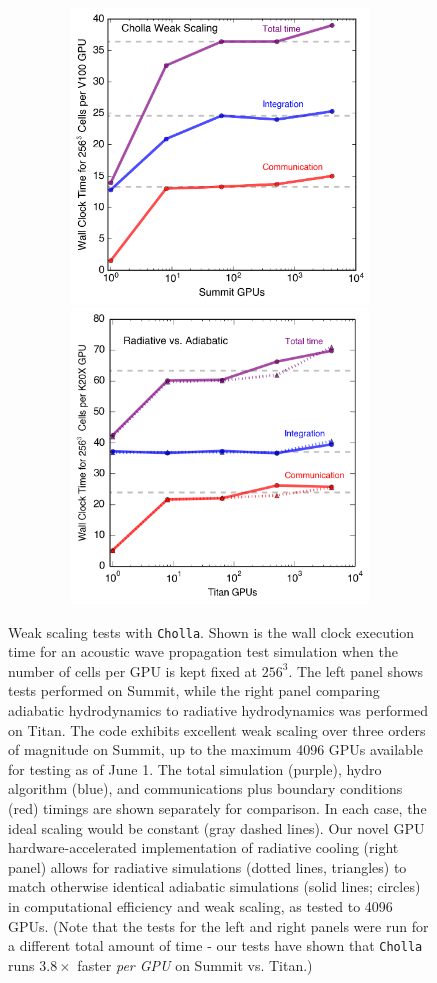 \documentclass[11pt,letterpaper,english]{article}
\begin{document}
\begin{figure}[h]
\centering
\includegraphics[width=4.52in, height=3.08in, keepaspectratio=true]{../scaling/weak_scaling_adiabatic.png}
\includegraphics[width=4.52in, height=3.08in, keepaspectratio=true]{weak_scaling_radiative.png}
\caption{Weak scaling tests with {\tt Cholla}. Shown is the wall clock execution time for an acoustic wave propagation test simulation when the number of cells per GPU is kept fixed at $256^3$. The left panel shows tests performed on Summit, while the right panel comparing adiabatic hydrodynamics to radiative hydrodynamics was performed on Titan.
The code exhibits excellent weak scaling over three orders of magnitude on Summit, up to the maximum 4096 GPUs available for testing as of June 1. The total simulation (purple), hydro algorithm (blue), and communications plus boundary conditions (red) timings are shown separately for comparison. In each case, the ideal scaling would be constant (gray dashed lines). Our novel GPU hardware-accelerated implementation of radiative cooling (right panel) allows for radiative simulations (dotted lines, triangles) to match otherwise identical 
adiabatic simulations (solid lines; circles) in computational efficiency and weak scaling, as tested to 4096 GPUs. (Note that the tests for the left and right panels were run for a different total amount of time - our tests have shown that {\tt Cholla} runs $3.8\times$ faster {\it per GPU} on Summit vs. Titan.)}
\label{fig:weak_scaling}
\end{figure}
\end{document}

